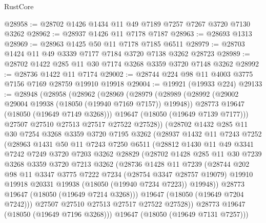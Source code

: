 \begin{lexlean}{RustCore}
\begin{coremodule}
@28958 := @28702 @1426 @1434 @11 @49 @7189 @7257 @7267 @3720 @7130 @3262
@28962 := @28937 @1426 @11 @7178 @7187
@28963 := @28693 @1313
@28969 := @28963 @1425 @50 @11 @7178 @7185 @6511
@28979 := @28703 @1424 @11 @49 @3339 @7177 @7184 @3720 @7138 @3262 @28723
@28989 := @28702 @1422 @285 @11 @30 @7174 @3268 @3359 @3720 @7148 @3262
@28992 := @28736 @1422 @11 @7174
@29002 := @28744 @224 @98 @11 @4003 @3775 @7156 @7169 @28759 @19910 @19918
@29004 := @19921 (@19933 @224)
@29133 := @28948
    (@28958
      (@28962
        (@28969
          (@28979
            (@28989
              (@28992 (@29002 @29004 @19938 (@18050 (@19940 @7169 @7157)) @19948))
              @28773
              @19647
              (@18050 (@19649 @7149 @3268)))
            @19647
            (@18050 (@19649 @7139 @7177)))
          @27507
          @27510
          @27513
          @27517
          @27522
          @27528))
      (@28702
        @1432
        @285
        @11
        @30
        @7254
        @3268
        @3359
        @3720
        @7195
        @3262
        (@28937
          @1432
          @11
          @7243
          @7252
          (@28963
            @1431
            @50
            @11
            @7243
            @7250
            @6511
            (@28812
              @1430
              @11
              @49
              @3341
              @7242
              @7249
              @3720
              @7203
              @3262
              @28829
              (@28702
                @1428
                @285
                @11
                @30
                @7239
                @3268
                @3359
                @3720
                @7213
                @3262
                (@28736
                  @1428
                  @11
                  @7239
                  (@28744
                    @202
                    @98
                    @11
                    @3347
                    @3775
                    @7222
                    @7234
                    (@28754 @3347 @28757 @19079)
                    @19910
                    @19918
                    @20331
                    @19938
                    (@18050 (@19940 @7234 @7223))
                    @19948))
                @28773
                @19647
                (@18050 (@19649 @7214 @3268)))
              @19647
              (@18050 (@19649 @7204 @7242)))
            @27507
            @27510
            @27513
            @27517
            @27522
            @27528))
        @28773
        @19647
        (@18050 (@19649 @7196 @3268)))
      @19647
      (@18050 (@19649 @7131 @7257)))

\end{coremodule}
\end{lexlean}
